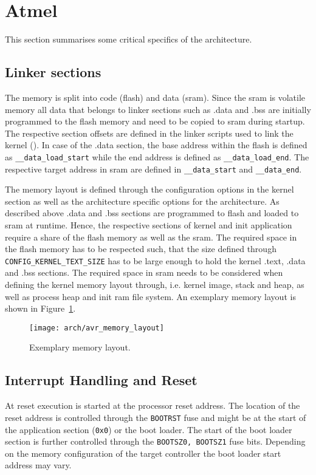 \section{Atmel \avr}
	This section summarises some critical specifics of the \avr architecture.

	\subsection{Linker sections}
		The \avr memory is split into code (flash) and data (\gls{sram}). Since the \gls{sram} is volatile memory all data that belongs to linker sections such as .data and .bss are initially programmed to the flash memory and need to be copied to \gls{sram} during startup. The respective section offsets are defined in the linker scripts used to link the kernel (). In case of the .data section, the base address within the flash is defined as \lstinline{__data_load_start} while the end address is defined as \lstinline{__data_load_end}. The respective target address in \gls{sram} are defined in \lstinline{__data_start} and \lstinline{__data_end}.

		The memory layout is defined through the configuration options in the kernel section as well as the architecture specific options for the \avr architecture. As described above .data and .bss sections are programmed to flash and loaded to \gls{sram} at runtime. Hence, the respective sections of kernel and init application require a share of the flash memory as well as the \gls{sram}. The required space in the flash memory has to be respected such, that the size defined through \lstinline{CONFIG_KERNEL_TEXT_SIZE} has to be large enough to hold the kernel .text, .data and .bss sections. The required space in \gls{sram} needs to be considered when defining the kernel memory layout through, i.e. kernel image, stack and heap, as well as process heap and init ram file system. An exemplary memory layout is shown in Figure~\ref{fig:avr_memory_layout}.
		\begin{figure}[h]
			\centering	
			\texttt{[image: arch/avr\_memory\_layout]}
			\caption{Exemplary \avr memory layout.}
			\label{fig:avr_memory_layout}
		\end{figure}

	\subsection{Interrupt Handling and Reset}
		At reset execution is started at the processor reset address. The location of the reset address is controlled through the \lstinline{BOOTRST} fuse and might be at the start of the application section (\lstinline{0x0}) or the boot loader. The start of the boot loader section is further controlled through the \lstinline{BOOTSZ0, BOOTSZ1} fuse bits. Depending on the memory configuration of the target controller the boot loader start address may vary.
		
